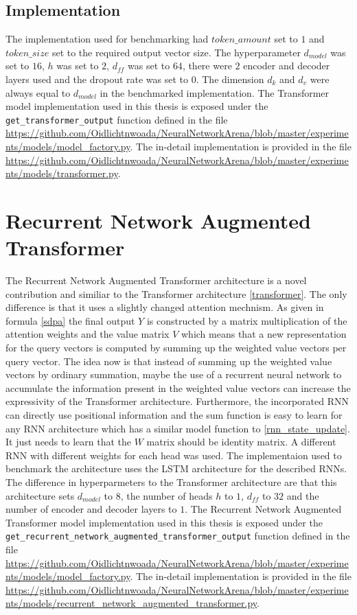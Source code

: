 \documentclass[draft,final]{vutinfth} %
\begin{document}
    \subsection{Implementation}
    The implementation used for benchmarking had $token\_amount$ set to $1$ and $token\_size$ set to the required output vector size.
    The hyperparameter $d_{model}$ was set to $16$, $h$ was set to $2$, $d_{ff}$ was set to $64$, there were $2$ encoder and decoder layers used and the dropout rate was set to $0$.
    The dimension $d_k$ and $d_v$ were always equal to $d_{model}$ in the benchmarked implementation.
    The Transformer model implementation used in this thesis is exposed under the \texttt{get\_transformer\_output} function defined in the file \url{https://github.com/Oidlichtnwoada/NeuralNetworkArena/blob/master/experiments/models/model_factory.py}.
    The in-detail implementation is provided in the file \url{https://github.com/Oidlichtnwoada/NeuralNetworkArena/blob/master/experiments/models/transformer.py}.

    \section{Recurrent Network Augmented Transformer} \label{rnaut}
    The Recurrent Network Augmented Transformer architecture is a novel contribution and similiar to the Transformer architecture \ref{transformer}.
    The only difference is that it uses a slightly changed attention mechnism.
    As given in formula \ref{sdpa} the final output $Y$ is constructed by a matrix multiplication of the attention weights and the value matrix $V$ which means that a new representation for the query vectors is computed by summing up the weighted value vectors per query vector.
    The idea now is that instead of summing up the weighted value vectors by ordinary summation, maybe the use of a recurrent neural network to accumulate the information present in the weighted value vectors can increase the expressivity of the Transformer architecture.
    Furthermore, the incorporated RNN can directly use positional information and the sum function is easy to learn for any RNN architecture which has a similar model function to \ref{rnn_state_update}.
    It just needs to learn that the $W$ matrix should be identity matrix.
    A different RNN with different weights for each head was used. 
    The implementaion used to benchmark the architecture uses the LSTM architecture for the described RNNs.
    The difference in hyperparmeters to the Transformer architecture are that this architecture sets $d_{model}$ to $8$, the number of heads $h$ to $1$, $d_{ff}$ to $32$ and the number of encoder and decoder layers to $1$.
    The Recurrent Network Augmented Transformer model implementation used in this thesis is exposed under the \texttt{get\_recurrent\_network\_augmented\_transformer\_output} function defined in the file \url{https://github.com/Oidlichtnwoada/NeuralNetworkArena/blob/master/experiments/models/model_factory.py}.
    The in-detail implementation is provided in the file \url{https://github.com/Oidlichtnwoada/NeuralNetworkArena/blob/master/experiments/models/recurrent_network_augmented_transformer.py}.
\end{document}
